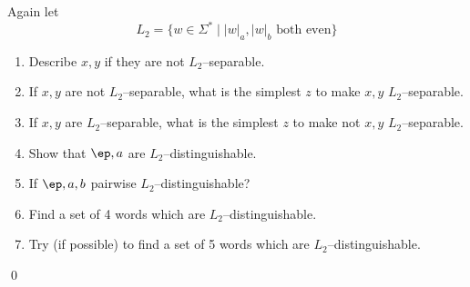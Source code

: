 \newpage
\begin{ex}
  Again let
  \[
  L_2 = \{w \in \Sigma^* \mid |w|_a, |w|_b \text{ both even}\}
  \]
  \begin{enumerate}[label=\textnormal{(\alph*)},itemsep=0pt,nosep,noitemsep,partopsep=0pt,topsep=0pt,parsep=0pt]
  \item Describe $x,y$ if they are not $L_2$--separable.
  \item If $x,y$ are not $L_2$--separable, what is the
    simplest $z$ to make $x,y$ $L_2$--separable.
  \item If $x,y$ are $L_2$--separable, what is the
    simplest $z$ to make not $x,y$ $L_2$--separable.
  \item Show that $\ep, a$ are $L_2$--distinguishable.
  \item If $\ep, a, b$ pairwise $L_2$--distinguishable?
  \item Find a set of 4 words which are $L_2$--distinguishable.
  \item
    Try (if possible)
    to find a set of 5 words which are $L_2$--distinguishable.  
  \end{enumerate}
  \qed
\end{ex}




